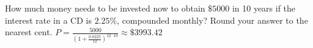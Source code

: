 {How much money needs to be invested now to obtain $\$5000$ in  10 years if the interest rate in a CD is $2.25 \%$, compounded monthly?  Round your answer to the nearest cent.}
{$P = \frac{5000}{\left(1 + \frac{0.0225}{12}\right)^{12 \cdot 10}} \approx \$ 3993.42$}